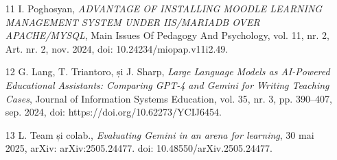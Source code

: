 \begin{itemize}
    \item [11] I. Poghosyan, \textit{ADVANTAGE OF INSTALLING MOODLE LEARNING MANAGEMENT SYSTEM UNDER IIS/MARIADB OVER APACHE/MYSQL}, Main Issues Of Pedagogy And Psychology, vol. 11, nr. 2, Art. nr. 2, nov. 2024, doi: 10.24234/miopap.v11i2.49.
    \item [12] G. Lang, T. Triantoro, și J. Sharp, \textit{Large Language Models as AI-Powered Educational Assistants: Comparing GPT-4 and Gemini for Writing Teaching Cases}, Journal of Information Systems Education, vol. 35, nr. 3, pp. 390–407, sep. 2024, doi: https://doi.org/10.62273/YCIJ6454.
    \item [13] L. Team și colab., \textit{Evaluating Gemini in an arena for learning}, 30 mai 2025, arXiv: arXiv:2505.24477. doi: 10.48550/arXiv.2505.24477.
\end{itemize}